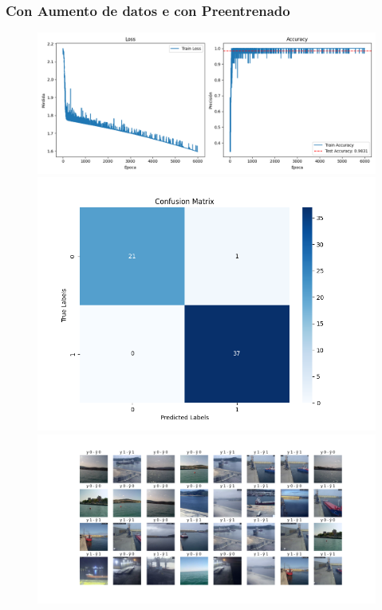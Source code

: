 \documentclass{article}
\begin{document}
\subsubsection{Con Aumento de datos e con Preentrenado}
\begin{figure}[H]
    \centering
    \begin{minipage}{0.55\textwidth}
        \centering
        \includegraphics[width=\linewidth]{../ultimas_figuras/LOSS__A_True_P_True_D_False_MLP_True_efficientnet_b4.png}
    \end{minipage}
    \begin{minipage}{0.3\textwidth}
        \centering
        \includegraphics[width=\linewidth]{../ultimas_figuras/CM__A_True_P_True_D_False_MLP_True_efficientnet_b4.png}
    \end{minipage}
    \begin{minipage}{0.7\textwidth}
        \centering
        \includegraphics[width=\linewidth]{../ultimas_figuras/GRID__A_True_P_True_D_False_MLP_True_efficientnet_b4.png}
    \end{minipage}
\end{figure}
\end{document}
